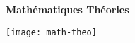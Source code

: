 
\newpage

\vspace{30mm}
\textbf{\Huge{Mathématiques Théories}}

\vspace{50mm}
\texttt{[image: math-theo]}
\newpage





